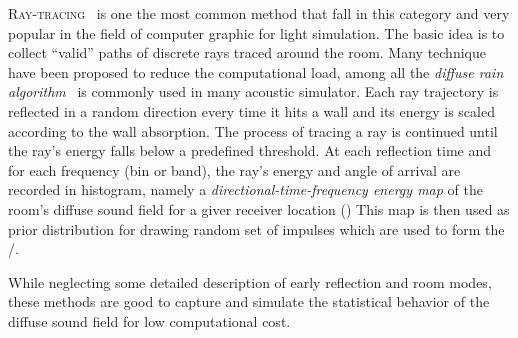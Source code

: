 \textsc{Ray-tracing}~\cite{kulowski1985algorithmic} is one the most common method that fall in this category and very popular
in the field of computer graphic for light simulation.
The basic idea is to collect ``valid'' paths of discrete rays traced around the room.
Many technique have been proposed to reduce the computational load, among all the \textit{diffuse rain algorithm}~\cite{schroder2007fast, heinz1993binaural}
is commonly used in many acoustic simulator.
Each ray trajectory is reflected in a random direction every time it hits a wall and its energy is scaled according to the wall absorption.
The process of tracing a ray is continued until the ray’s energy falls below a predefined threshold.
At each reflection time and for each frequency (bin or band), the ray's energy and angle of arrival are recorded in histogram,
namely a \textit{directional-time-frequency energy map} of the room’s diffuse sound field for a giver receiver location ()
This map is then used as prior distribution for drawing random set of impulses which are used to form the \RIR/.

While neglecting some detailed description of early reflection and room modes,
these methods are good to capture and simulate the statistical behavior of the diffuse sound field for low computational cost.



